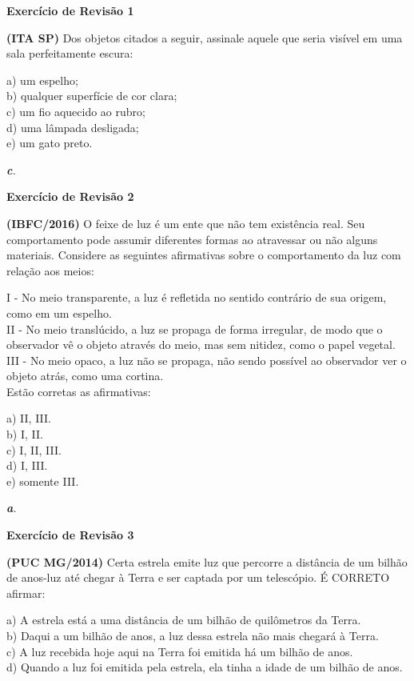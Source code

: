 \documentclass[11pt,twocolumn,oneside]{article}
\newenvironment{resposta*}
  {\bf Resposta:\\ }
  {}
\begin{document}
\textbf{Exercício de Revisão 1}


\textbf{(ITA SP)} Dos objetos citados a seguir, assinale aquele que seria visível em uma sala perfeitamente escura:


a)	um espelho; \\
b)	qualquer superfície de cor clara; \\
c)	um fio aquecido ao rubro; \\
d)	uma lâmpada desligada; \\
e)	um gato preto.


\begin{resposta*}
{\it \textbf{c}.}
\end{resposta*}

\textbf{Exercício de Revisão 2}


\textbf{(IBFC/2016)} O feixe de luz é um ente que não tem existência real. Seu comportamento pode assumir diferentes formas ao atravessar ou não alguns materiais. Considere as seguintes afirmativas sobre o comportamento da luz com relação aos meios:


I - No meio transparente, a luz é refletida no sentido contrário de sua origem, como em um espelho. \\
II - No meio translúcido, a luz se propaga de forma irregular, de modo que o observador vê o objeto através do meio, mas sem nitidez, como o papel vegetal. \\
III - No meio opaco, a luz não se propaga, não sendo possível ao observador ver o objeto atrás, como uma cortina. \\
Estão corretas as afirmativas:


a) II, III. \\
b) I, II. \\
c) I, II, III. \\
d) I, III. \\
e) somente III.


\begin{resposta*}
{\it \textbf{a}.}
\end{resposta*}

\textbf{Exercício de Revisão 3}


\textbf{(PUC MG/2014)} Certa estrela emite luz que percorre a distância de um bilhão de anos-luz até chegar à Terra e ser captada por um telescópio. É CORRETO afirmar:


a)	A estrela está a uma distância de um bilhão de quilômetros da Terra. \\
b)	Daqui a um bilhão de anos, a luz dessa estrela não mais chegará à Terra. \\
c)	A luz recebida hoje aqui na Terra foi emitida há um bilhão de anos. \\
d)	Quando a luz foi emitida pela estrela, ela tinha a idade de um bilhão de anos.
\end{document}
